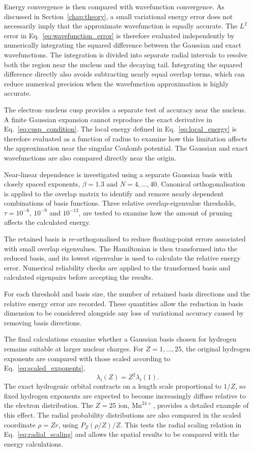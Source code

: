 Energy convergence is then compared with wavefunction convergence. As discussed in Section~\ref{chap:theory}, a small variational energy error does not necessarily imply that the approximate wavefunction is equally accurate. The $L^2$ error in Eq.~\eqref{eq:wavefunction_error} is therefore evaluated independently by numerically integrating the squared difference between the Gaussian and exact wavefunctions. The integration is divided into separate radial intervals to resolve both the region near the nucleus and the decaying tail. Integrating the squared difference directly also avoids subtracting nearly equal overlap terms, which can reduce numerical precision when the wavefunction approximation is highly accurate.

The electron--nucleus cusp provides a separate test of accuracy near the nucleus. A finite Gaussian expansion cannot reproduce the exact derivative in Eq.~\eqref{eq:cusp_condition}. The local energy defined in Eq.~\eqref{eq:local_energy} is therefore evaluated as a function of radius to examine how this limitation affects the approximation near the singular Coulomb potential. The Gaussian and exact wavefunctions are also compared directly near the origin.

Near-linear dependence is investigated using a separate Gaussian basis with closely spaced exponents, $\beta=1.3$ and $N=4,\ldots,40$. Canonical orthogonalisation is applied to the overlap matrix to identify and remove nearly dependent combinations of basis functions. Three relative overlap-eigenvalue thresholds, $\tau=10^{-6}$, $10^{-9}$ and $10^{-12}$, are tested to examine how the amount of pruning affects the calculated energy.

The retained basis is re-orthogonalised to reduce floating-point errors associated with small overlap eigenvalues. The Hamiltonian is then transformed into the reduced basis, and its lowest eigenvalue is used to calculate the relative energy error. Numerical reliability checks are applied to the transformed basis and calculated eigenpairs before accepting the results.

For each threshold and basis size, the number of retained basis directions and the relative energy error are recorded. These quantities allow the reduction in basis dimension to be considered alongside any loss of variational accuracy caused by removing basis directions.

The final calculations examine whether a Gaussian basis chosen for hydrogen remains suitable at larger nuclear charges. For $Z=1,\ldots,25$, the original hydrogen exponents are compared with those scaled according to Eq.~\eqref{eq:scaled_exponents},
\[
    \lambda_i(Z)=Z^2\lambda_i(1).
\]
The exact hydrogenic orbital contracts on a length scale proportional to $1/Z$, so fixed hydrogen exponents are expected to become increasingly diffuse relative to the electron distribution. The $Z=25$ ion, $\mathrm{Mn}^{24+}$, provides a detailed example of this effect. The radial probability distributions are also compared in the scaled coordinate $\rho=Zr$, using $P_Z(\rho/Z)/Z$. This tests the radial scaling relation in Eq.~\eqref{eq:radial_scaling} and allows the spatial results to be compared with the energy calculations.

